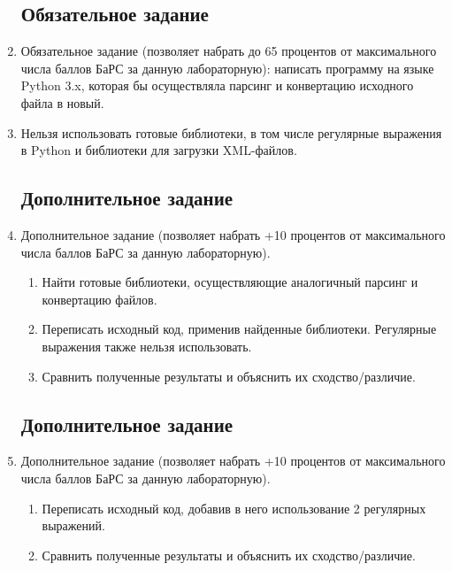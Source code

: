 \begin{enumerate}
            \subsection{Обязательное задание}
      \item  Обязательное задание (позволяет набрать до 65 процентов от
            максимального числа баллов БаРС за данную лабораторную):
            написать программу на языке Python 3.x, которая бы осуществляла
            парсинг и конвертацию исходного файла в новый.
      \item  Нельзя использовать готовые библиотеки, в том числе регулярные
            выражения в Python и библиотеки для загрузки XML-файлов.
            \lstset{language=Python}
            \lstset{language=XML}

            \subsection{Дополнительное задание }
      \item  Дополнительное задание  (позволяет набрать +10
            процентов от максимального числа баллов БаРС за данную
            лабораторную).
            \begin{enumerate}
                  \item Найти готовые библиотеки, осуществляющие аналогичный
                        парсинг и конвертацию файлов.
                  \item Переписать исходный код, применив найденные
                        библиотеки. Регулярные выражения также нельзя
                        использовать.
                  \item Сравнить полученные результаты и объяснить их
                        сходство/различие.
            \end{enumerate}

            \lstset{language=Python}
            \lstset{language=XML}

            \subsection{Дополнительное задание }
      \item Дополнительное задание  (позволяет набрать +10
            процентов от максимального числа баллов БаРС за данную
            лабораторную).
            \begin{enumerate}
                  \item Переписать исходный код, добавив в него использование
                        2
                        регулярных выражений.
                  \item Сравнить полученные результаты и объяснить их
                        сходство/различие.
            \end{enumerate}



\end{enumerate}
